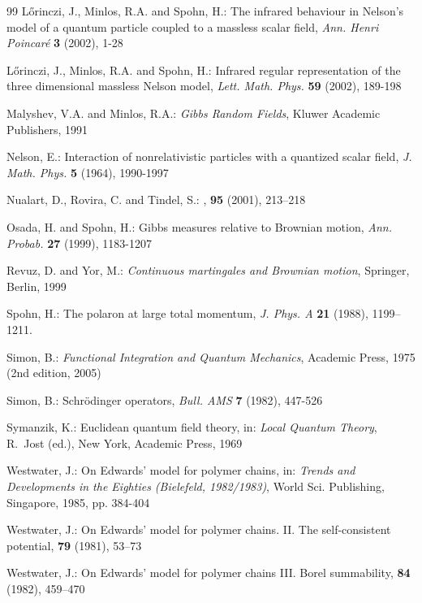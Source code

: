 \documentclass[a4paper,11pt]{article}
\begin{document}
\begin{thebibliography}{99}
L\H{o}rinczi, J., Minlos, R.A. and Spohn, H.: The infrared behaviour 
in Nelson's model of a quantum particle coupled to a massless scalar 
field, {\it Ann. Henri Poincar\'e} {\bf 3} (2002), 1-28 

L\H{o}rinczi, J., Minlos, R.A. and Spohn, H.: Infrared regular
representation of the three dimensional massless Nelson model, 
{\it Lett. Math. Phys.} {\bf 59} (2002), 189-198 

Malyshev, V.A. and Minlos, R.A.: {\it Gibbs Random Fields}, Kluwer 
Academic Publishers, 1991

Nelson, E.: Interaction of nonrelativistic particles with a quantized 
scalar field, {\em J. Math. Phys.} {\bf 5} (1964), 1990-1997 

Nualart, D., Rovira, C. and Tindel, S.:
,
 {\bf 95} (2001), 213--218

Osada, H. and Spohn, H.: Gibbs measures relative to Brownian motion, 
{\it Ann. Probab.} {\bf 27} (1999), 1183-1207 

Revuz, D. and Yor, M.:
{\it Continuous martingales and {B}rownian motion}, Springer, Berlin, 
1999        

Spohn, H.: The polaron at large total momentum, {\it J. Phys. A} 
{\bf  21}  (1988), 1199--1211.

Simon, B.: {\it Functional Integration and Quantum Mechanics}, Academic
Press, 1975 (2nd edition, 2005)

Simon, B.: Schr\"odinger operators, {\it Bull. AMS} {\bf 7} (1982),
447-526

Symanzik, K.:
\newblock Euclidean quantum field theory,
\newblock in: {\em Local Quantum Theory}, R.~Jost (ed.), New York, 
  Academic Press, 1969

Westwater, J.:
\newblock On {E}dwards' model for polymer chains,
\newblock in: {\em Trends and Developments in the Eighties 
(Bielefeld, 1982/1983)}, World Sci. Publishing, Singapore, 1985, 
pp. 384-404

Westwater, J.:
\newblock On {E}dwards' model for polymer chains. {II}. 
{T}he self-consistent potential,
 {\bf 79} (1981), 53--73

Westwater, J.:
\newblock On {E}dwards' model for polymer chains {III}. {B}orel 
summability,
 {\bf 84} (1982), 459--470


\end{thebibliography}
\end{document}
